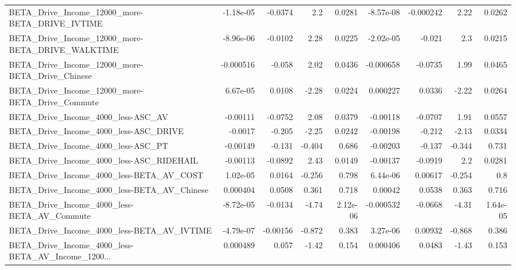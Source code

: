 \begin{tabular}{lrrrrrrrr}
BETA\_Drive\_Income\_12000\_more-BETA\_DRIVE\_IVTIME     &   -1.18e-05 &      -0.0374 &       2.2 &   0.0281 &  -8.57e-08 &   -0.000242 &         2.22 &        0.0262 \\
BETA\_Drive\_Income\_12000\_more-BETA\_DRIVE\_WALKTIME   &   -8.96e-06 &      -0.0102 &      2.28 &   0.0225 &  -2.02e-05 &      -0.021 &          2.3 &        0.0215 \\
BETA\_Drive\_Income\_12000\_more-BETA\_Drive\_Chinese    &   -0.000516 &       -0.058 &      2.02 &   0.0436 &  -0.000658 &     -0.0735 &         1.99 &        0.0465 \\
BETA\_Drive\_Income\_12000\_more-BETA\_Drive\_Commute    &    6.67e-05 &       0.0108 &     -2.28 &   0.0224 &   0.000227 &      0.0336 &        -2.22 &        0.0264 \\
BETA\_Drive\_Income\_4000\_less-ASC\_AV                 &    -0.00111 &      -0.0752 &      2.08 &   0.0379 &   -0.00118 &     -0.0707 &         1.91 &        0.0557 \\
BETA\_Drive\_Income\_4000\_less-ASC\_DRIVE              &     -0.0017 &       -0.205 &     -2.25 &   0.0242 &   -0.00198 &      -0.212 &        -2.13 &        0.0334 \\
BETA\_Drive\_Income\_4000\_less-ASC\_PT                 &    -0.00149 &       -0.131 &    -0.404 &    0.686 &   -0.00203 &      -0.137 &       -0.344 &         0.731 \\
BETA\_Drive\_Income\_4000\_less-ASC\_RIDEHAIL           &    -0.00113 &      -0.0892 &      2.43 &   0.0149 &   -0.00137 &     -0.0919 &          2.2 &        0.0281 \\
BETA\_Drive\_Income\_4000\_less-BETA\_AV\_COST           &    1.02e-05 &       0.0164 &    -0.256 &    0.798 &   6.44e-06 &     0.00617 &       -0.254 &           0.8 \\
BETA\_Drive\_Income\_4000\_less-BETA\_AV\_Chinese        &    0.000404 &       0.0508 &     0.361 &    0.718 &    0.00042 &      0.0538 &        0.363 &         0.716 \\
BETA\_Drive\_Income\_4000\_less-BETA\_AV\_Commute        &   -8.72e-05 &      -0.0134 &     -4.74 & 2.12e-06 &  -0.000532 &     -0.0668 &        -4.31 &      1.64e-05 \\
BETA\_Drive\_Income\_4000\_less-BETA\_AV\_IVTIME         &   -4.79e-07 &     -0.00156 &    -0.872 &    0.383 &   3.27e-06 &     0.00932 &       -0.868 &         0.386 \\
BETA\_Drive\_Income\_4000\_less-BETA\_AV\_Income\_1200... &    0.000489 &        0.057 &     -1.42 &    0.154 &   0.000406 &      0.0483 &        -1.43 &         0.153 \\

\end{tabular}
